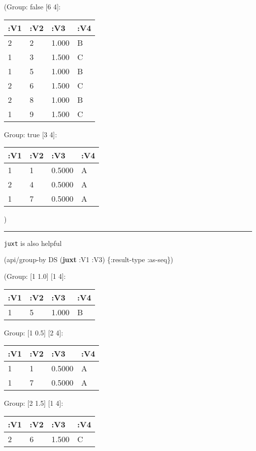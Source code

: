 \documentclass[]{article}
\newenvironment{Shaded}{\begin{snugshade}}{\end{snugshade}}
\newcommand{\KeywordTok}[1]{\textcolor[rgb]{0.13,0.29,0.53}{\textbf{#1}}}
\newcommand{\AttributeTok}[1]{\textcolor[rgb]{0.77,0.63,0.00}{#1}}
\newcommand{\NormalTok}[1]{#1}
\begin{document}
(Group: false {[}6 4{]}:

\begin{longtable}[]{@{}llll@{}}
\toprule
:V1 & :V2 & :V3 & :V4\tabularnewline
\midrule
\endhead
2 & 2 & 1.000 & B\tabularnewline
1 & 3 & 1.500 & C\tabularnewline
1 & 5 & 1.000 & B\tabularnewline
2 & 6 & 1.500 & C\tabularnewline
2 & 8 & 1.000 & B\tabularnewline
1 & 9 & 1.500 & C\tabularnewline
\bottomrule
\end{longtable}

Group: true {[}3 4{]}:

\begin{longtable}[]{@{}llll@{}}
\toprule
:V1 & :V2 & :V3 & :V4\tabularnewline
\midrule
\endhead
1 & 1 & 0.5000 & A\tabularnewline
2 & 4 & 0.5000 & A\tabularnewline
1 & 7 & 0.5000 & A\tabularnewline
\bottomrule
\end{longtable}

)

\begin{center}\rule{0.5\linewidth}{0.5pt}\end{center}

\texttt{juxt} is also helpful

\begin{Shaded}
\begin{Highlighting}[]
\NormalTok{(api/group-by DS (}\KeywordTok{juxt} \AttributeTok{:V1} \AttributeTok{:V3}\NormalTok{) \{}\AttributeTok{:result-type} \AttributeTok{:as-seq}\NormalTok{\})}
\end{Highlighting}
\end{Shaded}

(Group: {[}1 1.0{]} {[}1 4{]}:

\begin{longtable}[]{@{}llll@{}}
\toprule
:V1 & :V2 & :V3 & :V4\tabularnewline
\midrule
\endhead
1 & 5 & 1.000 & B\tabularnewline
\bottomrule
\end{longtable}

Group: {[}1 0.5{]} {[}2 4{]}:

\begin{longtable}[]{@{}llll@{}}
\toprule
:V1 & :V2 & :V3 & :V4\tabularnewline
\midrule
\endhead
1 & 1 & 0.5000 & A\tabularnewline
1 & 7 & 0.5000 & A\tabularnewline
\bottomrule
\end{longtable}

Group: {[}2 1.5{]} {[}1 4{]}:

\begin{longtable}[]{@{}llll@{}}
\toprule
:V1 & :V2 & :V3 & :V4\tabularnewline
\midrule
\endhead
2 & 6 & 1.500 & C\tabularnewline
\bottomrule
\end{longtable}
\end{document}
